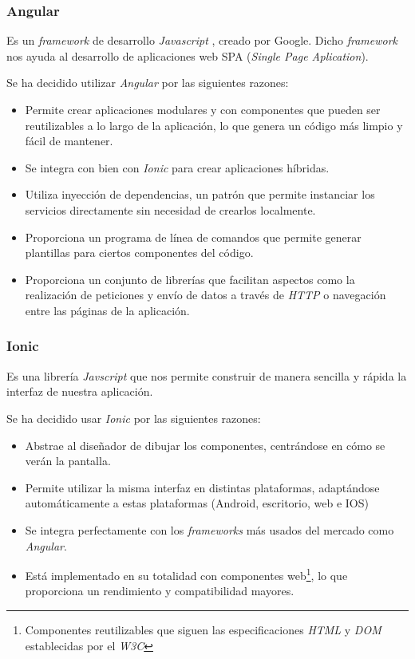 \subsubsection{Angular~\cite{angular}}
Es un \textit{framework} de desarrollo \textit{Javascript} , creado por Google. Dicho \textit{framework} nos ayuda al desarrollo de aplicaciones web SPA (\textit{Single Page Aplication}).

Se ha decidido utilizar \textit{Angular} por las siguientes razones:
\begin{itemize}
    \item Permite crear aplicaciones modulares y con componentes que pueden ser reutilizables a lo largo de la aplicación, lo que genera un código más limpio y fácil de mantener.
    \item Se integra con bien con \textit{Ionic} para crear aplicaciones híbridas.
    \item Utiliza inyección de dependencias, un patrón que permite instanciar los servicios directamente sin necesidad de crearlos localmente.
    \item Proporciona un programa de línea de comandos que permite generar plantillas para ciertos componentes del código.
    \item Proporciona un conjunto de librerías que facilitan aspectos como la realización de peticiones y envío de datos a través de \textit{HTTP} o navegación entre las páginas de la aplicación.
\end{itemize}

\subsubsection{Ionic~\cite{ionic}}
Es una librería \textit{Javscript} que nos permite construir de manera sencilla y rápida la interfaz de nuestra aplicación.

Se ha decidido usar \textit{Ionic} por las siguientes razones:
\begin{itemize}
    \item Abstrae al diseñador de dibujar los componentes, centrándose en cómo se verán la pantalla.
    \item Permite utilizar la misma interfaz en distintas plataformas, adaptándose automáticamente a estas plataformas (Android, escritorio, web e IOS)
    \item Se integra perfectamente con los \textit{frameworks} más usados del mercado como \textit{Angular}.
    \item Está implementado en su totalidad con componentes web\footnote{Componentes reutilizables que siguen las especificaciones \textit{HTML} y \textit{DOM} establecidas por el \textit{W3C}}, lo que proporciona un rendimiento y compatibilidad mayores.
\end{itemize}

